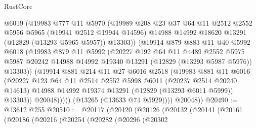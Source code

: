 \begin{lexlean}{RustCore}
\begin{coremodule}
                  @6019
                  (@19983
                    @777
                    @11
                    @5970
                    (@19989
                      @208
                      @23
                      @37
                      @64
                      @11
                      @2512
                      @2552
                      @5956
                      @5965
                      (@19941 @2512 @19944 @14596)
                      @14988
                      @14992
                      @18620
                      @13291
                      (@12829 (@13293 @5965 @5957))
                      @13303))
                  (@19914
                    @879
                    @883
                    @11
                    @40
                    @5992
                    @6018
                    (@19983
                      @879
                      @11
                      @5992
                      (@20227
                        @192
                        @64
                        @11
                        @4489
                        @2552
                        @5975
                        @5987
                        @20242
                        @14988
                        @14992
                        @19340
                        @13291
                        (@12829 (@13293 @5987 @5976))
                        @13303))
                    (@19914
                      @881
                      @214
                      @11
                      @27
                      @6016
                      @2518
                      (@19983
                        @881
                        @11
                        @6016
                        (@20227
                          @123
                          @64
                          @11
                          @2514
                          @2552
                          @5998
                          @6011
                          (@20237 @2514 @20240 @14613)
                          @14988
                          @14992
                          @19374
                          @13291
                          (@12829 (@13293 @6011 @5999))
                          @13303))
                      @20048)))))
            (@13265 (@13633 @74 @5929))))
        @20048))
@20490 := @13612 @255
@20510 := @20117
    (@20120
      (@20126
        (@20132
          (@20141
            (@20161
              (@20186
                (@20216
                  (@20254
                    (@20282
                      (@20296
                        (@20302

\end{coremodule}
\end{lexlean}
